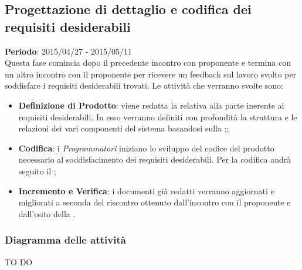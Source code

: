 	\subsection{Progettazione di dettaglio e codifica dei requisiti desiderabili} %
	\label{sub:progettazione_di_dettaglio_e_codifica_dei_requisiti_desiderabili}
	\textbf{Periodo}:  2015/04/27 - 2015/05/11 \\
	Questa fase comincia dopo il precedente incontro con proponente e termina con un altro incontro con il proponente per ricevere un feedback sul lavoro svolto per soddisfare i requisiti desiderabili trovati.
	Le attività che verranno svolte sono:
		\begin{itemize}
			\item \textbf{Definizione di Prodotto}: viene redatta la \docNameVersionDdP{} relativa alla parte inerente ai requisiti desiderabili. In esso verranno definiti con profondità la struttura e le relazioni dei vari componenti del sistema basandosi sulla \docNameVersionST;;
			\item \textbf{Codifica}: i \emph{Programmatori} iniziano lo sviluppo del codice del prodotto necessario al soddisfacimento dei requisiti desiderabili. Per la codifica andrà seguito il \docNameVersionDdP;
			\item \textbf{Incremento e Verifica}: i documenti già redatti verranno aggiornati e migliorati a seconda del riscontro ottenuto dall'incontro con il proponente e dall'esito della \RPmin.
		\end{itemize}
		
		\subsubsection{Diagramma delle attività} %
		\label{ssub:diagramma_delle_attivita}
		TO DO
	
